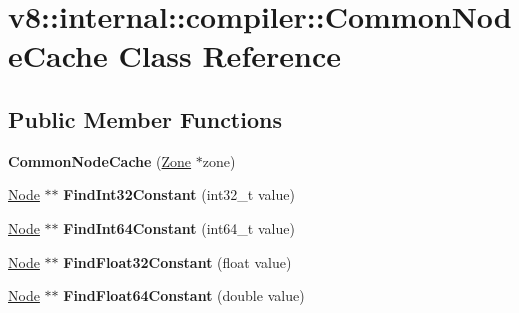 \hypertarget{classv8_1_1internal_1_1compiler_1_1_common_node_cache}{}\section{v8\+:\+:internal\+:\+:compiler\+:\+:Common\+Node\+Cache Class Reference}
\label{classv8_1_1internal_1_1compiler_1_1_common_node_cache}
\subsection*{Public Member Functions}
\begin{DoxyCompactItemize}
\item 
{\bfseries Common\+Node\+Cache} (\hyperlink{classv8_1_1internal_1_1_zone}{Zone} $\ast$zone)\hypertarget{classv8_1_1internal_1_1compiler_1_1_common_node_cache_a7b060a6fa1a819e054c6f6d077a24698}{}\label{classv8_1_1internal_1_1compiler_1_1_common_node_cache_a7b060a6fa1a819e054c6f6d077a24698}

\item 
\hyperlink{classv8_1_1internal_1_1compiler_1_1_node}{Node} $\ast$$\ast$ {\bfseries Find\+Int32\+Constant} (int32\+\_\+t value)\hypertarget{classv8_1_1internal_1_1compiler_1_1_common_node_cache_a6c45b23038d39b61834b4032a61d0985}{}\label{classv8_1_1internal_1_1compiler_1_1_common_node_cache_a6c45b23038d39b61834b4032a61d0985}

\item 
\hyperlink{classv8_1_1internal_1_1compiler_1_1_node}{Node} $\ast$$\ast$ {\bfseries Find\+Int64\+Constant} (int64\+\_\+t value)\hypertarget{classv8_1_1internal_1_1compiler_1_1_common_node_cache_a1454722b75ad5486b57e19503aa87ed9}{}\label{classv8_1_1internal_1_1compiler_1_1_common_node_cache_a1454722b75ad5486b57e19503aa87ed9}

\item 
\hyperlink{classv8_1_1internal_1_1compiler_1_1_node}{Node} $\ast$$\ast$ {\bfseries Find\+Float32\+Constant} (float value)\hypertarget{classv8_1_1internal_1_1compiler_1_1_common_node_cache_ad883d0e15ad2d83ffe2c70efee0f8fcb}{}\label{classv8_1_1internal_1_1compiler_1_1_common_node_cache_ad883d0e15ad2d83ffe2c70efee0f8fcb}

\item 
\hyperlink{classv8_1_1internal_1_1compiler_1_1_node}{Node} $\ast$$\ast$ {\bfseries Find\+Float64\+Constant} (double value)\hypertarget{classv8_1_1internal_1_1compiler_1_1_common_node_cache_a35ff1bcea9ca5228c771cfe0f64ad0a7}{}\label{classv8_1_1internal_1_1compiler_1_1_common_node_cache_a35ff1bcea9ca5228c771cfe0f64ad0a7}


\end{DoxyCompactItemize}
